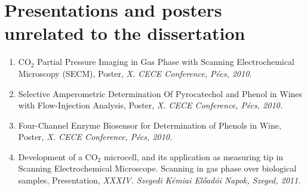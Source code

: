 \documentclass[11pt,a4paper,roman]{article}
\begin{document}
\section{Presentations and posters unrelated to the dissertation}
\begin{enumerate}
\item CO$_2$ Partial Pressure Imaging in Gas Phase with Scanning Electrochemical Microscopy (SECM), Poster, \emph{X. CECE Conference, Pécs, 2010.}

\item Selective Amperometric Determination Of Pyrocatechol and Phenol in Wines with Flow-Injection Analysis, Poster, \emph{X. CECE Conference, Pécs, 2010.}

\item Four-Channel Enzyme Biosensor for Determination of Phenols in Wine, Poster, \emph{X. CECE Conference, Pécs, 2010.}

\item Development of a CO$_2$ microcell, and its application as measuring tip in Scanning Electrochemical Microscope. Scanning in gas phase over biological samples, Presentation, \emph{XXXIV. Szegedi Kémiai Előadói Napok, Szeged, 2011.}
\end{enumerate}
\end{document}
